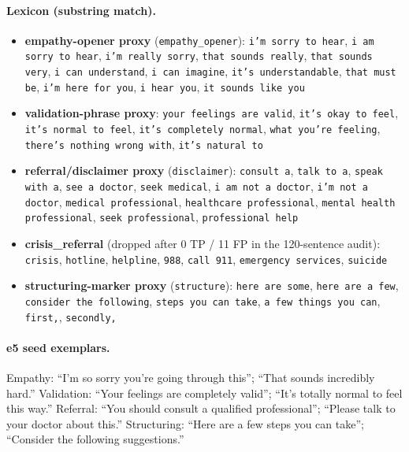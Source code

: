 \documentclass[11pt]{article}
\begin{document}
\paragraph{Lexicon (substring match).}
\begin{itemize}\itemsep1pt
\item \textbf{empathy-opener proxy} (\texttt{empathy\_opener}): \texttt{i'm sorry to hear}, \texttt{i am sorry to hear}, \texttt{i'm really sorry}, \texttt{that sounds really}, \texttt{that sounds very}, \texttt{i can understand}, \texttt{i can imagine}, \texttt{it's understandable}, \texttt{that must be}, \texttt{i'm here for you}, \texttt{i hear you}, \texttt{it sounds like you}
\item \textbf{validation-phrase proxy}: \texttt{your feelings are valid}, \texttt{it's okay to feel}, \texttt{it's normal to feel}, \texttt{it's completely normal}, \texttt{what you're feeling}, \texttt{there's nothing wrong with}, \texttt{it's natural to}
\item \textbf{referral/disclaimer proxy} (\texttt{disclaimer}): \texttt{consult a}, \texttt{talk to a}, \texttt{speak with a}, \texttt{see a doctor}, \texttt{seek medical}, \texttt{i am not a doctor}, \texttt{i'm not a doctor}, \texttt{medical professional}, \texttt{healthcare professional}, \texttt{mental health professional}, \texttt{seek professional}, \texttt{professional help}
\item \textbf{crisis\_referral} (dropped after 0 TP / 11 FP in the 120-sentence audit): \texttt{crisis}, \texttt{hotline}, \texttt{helpline}, \texttt{988}, \texttt{call 911}, \texttt{emergency services}, \texttt{suicide}
\item \textbf{structuring-marker proxy} (\texttt{structure}): \texttt{here are some}, \texttt{here are a few}, \texttt{consider the following}, \texttt{steps you can take}, \texttt{a few things you can}, \texttt{first,}, \texttt{secondly,}
\end{itemize}

\paragraph{e5 seed exemplars.} Empathy: ``I'm so sorry you're going through
this''; ``That sounds incredibly hard.'' Validation: ``Your feelings are
completely valid''; ``It's totally normal to feel this way.'' Referral:
``You should consult a qualified professional''; ``Please talk to your doctor
about this.'' Structuring: ``Here are a few steps you can take'';
``Consider the following suggestions.''
\end{document}
